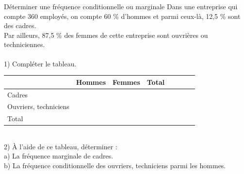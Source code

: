 \begin{methodeTitre}{Déterminer une fréquence conditionnelle ou marginale}
	Dans une entreprise qui compte 360 employés, on compte 60 \% d'hommes et parmi ceux-là, 12,5 \% sont des cadres.\\
	Par ailleurs, 87,5 \% des femmes de cette entreprise sont ouvrières ou techniciennes.\\
	\\
	1) Compléter le tableau.\\
	
	\begin{tabular}{ | Xc | Xc | Xc | Xc | }
		\hline			
		& Hommes & Femmes & Total \\ \hline
		Cadres &   &   &   \\ \hline
		Ouvriers, techniciens &   &   &  \\ \hline
		Total &   &   &   \\
		\hline  
	\end{tabular}
	\\					
	
	2) À l'aide de ce tableau, déterminer :\\
	a) La fréquence marginale de cadres.\\
	b) La fréquence conditionnelle des ouvriers, techniciens parmi les hommes.\\
	\\ 
	

\end{methodeTitre}
